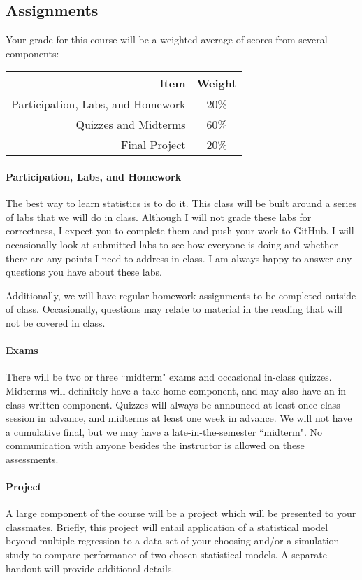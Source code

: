 \documentclass[11pt]{article}
\begin{document}
\subsection*{Assignments}

Your grade for this course will be a weighted average of scores from several components:

\begin{table}[!h]
\centering
\begin{tabular}{r c}
\toprule
Item & Weight \\
\midrule
Participation, Labs, and Homework & 20\% \\
\cmidrule(r){1-2}
\cmidrule(r){1-2}
Quizzes and Midterms & 60\% \\
\cmidrule(r){1-2}
Final Project & 20\% \\
\bottomrule
\end{tabular}
\end{table}

\paragraph{Participation, Labs, and Homework}
The best way to learn statistics is to do it.  This class will be built around a series of labs that we will do in class.  Although I will not grade these labs for correctness, I expect you to complete them and push your work to GitHub.  I will occasionally look at submitted labs to see how everyone is doing and whether there are any points I need to address in class.  I am always happy to answer any questions you have about these labs.

Additionally, we will have regular homework assignments to be completed outside of class.
Occasionally, questions may relate to material in the reading that will not be covered in class.

\paragraph{Exams}
There will be two or three ``midterm" exams and occasional in-class quizzes.
Midterms will definitely have a take-home component, and may also have an in-class written component.
Quizzes will always be announced at least once class session in advance, and midterms at least one week in advance.
We will not have a cumulative final, but we may have a late-in-the-semester ``midterm".
No communication with anyone besides the instructor is allowed on these assessments.

\paragraph{Project}
A large component of the course will be a project which will be presented to your classmates.
Briefly, this project will entail application of a statistical model beyond multiple regression to a data set of your choosing and/or a simulation study to compare performance of two chosen statistical models.
A separate handout will provide additional details.
\end{document}
